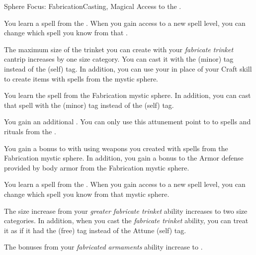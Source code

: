     \begin{feat}{Sphere Focus: Fabrication}{Casting, Magical}
        \featpre Access to the  .

         You learn a spell from the  .
        When you gain access to a new spell level, you can change which spell you know from that .

         The maximum size of the trinket you can create with your \textit{fabricate trinket} cantrip increases by one size category.
        You can cast it with the  (minor) tag instead of the  (self) tag.
        In addition, you can use your  in place of your Craft skill to create items with spells from the  mystic sphere.

         You learn the  spell from the Fabrication mystic sphere.
        In addition, you can cast that spell with the  (minor) tag instead of the  (self) tag.

         You gain an additional .
        You can only use this attunement point to  to spells and rituals from the  .

         You gain a  bonus to  with  using weapons you created with spells from the Fabrication mystic sphere.
        In addition, you gain a  bonus to the Armor defense provided by body armor from the Fabrication mystic sphere.

         You learn a spell from the  .
        When you gain access to a new spell level, you can change which spell you know from that mystic sphere.

         The size increase from your \textit{greater fabricate trinket} ability increases to two size categories.
        In addition, when you cast the \textit{fabricate trinket} ability, you can treat it as if it had the  (free) tag instead of the Attune (self) tag.

         The bonuses from your \textit{fabricated armaments} ability increase to .
    \end{feat}


